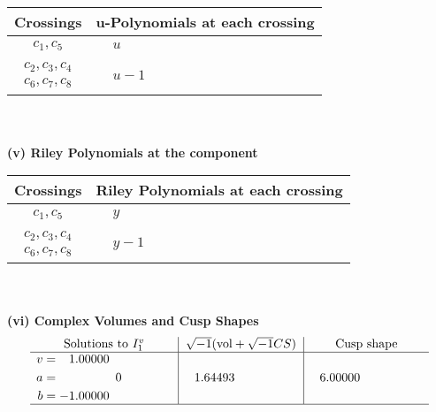 \documentclass[1p]{elsarticle_modified}
\theoremstyle{definition}
\newcommand{\I}{\sqrt{-1}}
\begin{document}
\begin{tabular}{m{50pt}|m{274pt}}
Crossings & \hspace{64pt}u-Polynomials at each crossing \\
\hline $$\begin{aligned}c_{1},c_{5}\end{aligned}$$&$\begin{aligned}
&u
\end{aligned}$\\
\hline $$\begin{aligned}c_{2},c_{3},c_{4}\\c_{6},c_{7},c_{8}\end{aligned}$$&$\begin{aligned}
&u-1
\end{aligned}$\\
\hline
\end{tabular}\\~\\
\newpage\renewcommand{\arraystretch}{1}
\flushleft \textbf{(v) Riley Polynomials at the component}\newline \\
\begin{tabular}{m{50pt}|m{274pt}}
Crossings & \hspace{64pt}Riley Polynomials at each crossing \\
\hline $$\begin{aligned}c_{1},c_{5}\end{aligned}$$&$\begin{aligned}
&y
\end{aligned}$\\
\hline $$\begin{aligned}c_{2},c_{3},c_{4}\\c_{6},c_{7},c_{8}\end{aligned}$$&$\begin{aligned}
&y-1
\end{aligned}$\\
\hline
\end{tabular}\\~\\
\newpage\flushleft \textbf{(vi) Complex Volumes and Cusp Shapes}
$$\begin{array}{c|c|c}  
\text{Solutions to }I^v_{1}& \I (\text{vol} + \sqrt{-1}CS) & \text{Cusp shape}\\
 \hline 
\begin{aligned}
v &= \phantom{-}1.00000\phantom{ +0.000000I} \\
a &= \phantom{-0.000000 } 0 \\
b &= -1.00000\phantom{ +0.000000I}\end{aligned}
 & \phantom{-}1.64493\phantom{ +0.000000I} & \phantom{-}6.00000\phantom{ +0.000000I}\\
 \hline 
 \end{array}$$\newpage
\end{document}
